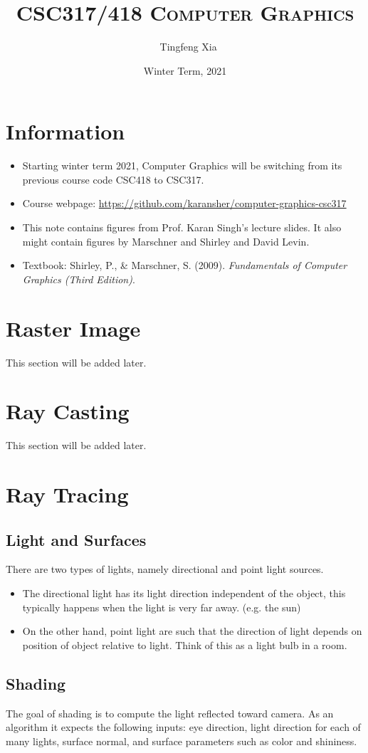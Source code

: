 \documentclass[11pt]{article}
\author{\ccLogo\,\, Tingfeng Xia}
\title{\textsc{CSC317/418 Computer Graphics}}
\date{Winter Term, 2021}
\begin{document}
\maketitle
\doclicenseThis
\section*{Information}
\begin{itemize}
	\item Starting winter term 2021, Computer Graphics will be switching from its previous course code CSC418 to CSC317. 
	\item Course webpage: \url{https://github.com/karansher/computer-graphics-csc317}
	\item This note contains figures from Prof. Karan Singh's lecture slides. It also might contain figures by Marschner and Shirley and David Levin. 
	\item Textbook: Shirley, P., \& Marschner, S. (2009). \textit{Fundamentals of Computer Graphics (Third Edition)}. 
\end{itemize}
\tableofcontents
\section{Raster Image} This section will be added later. 
\section{Ray Casting} This section will be added later. 
\section{Ray Tracing}
\subsection{Light and Surfaces}
There are two types of lights, namely directional and point light sources. 
\begin{itemize}
	\item The directional light has its light direction independent of the object, this typically happens when the light is very far away. (e.g. the sun)
	\item On the other hand, point light are such that the direction of light depends on position of object relative to light. Think of this as a light bulb in a room. 
\end{itemize}
\subsection{Shading}
The goal of shading is to compute the light reflected toward camera. As an algorithm it expects the following inputs: eye direction, light direction for each of many lights, surface normal, and surface parameters such as color and shininess. 
\end{document}
